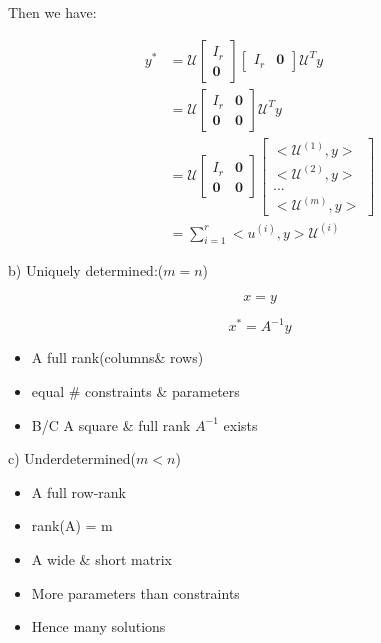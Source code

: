 Then we have:

\begin{align*}
y^{*} &= \mathcal{U}
\begin{bmatrix}
I_r\\
\textbf{0}
\end{bmatrix}
\begin{bmatrix}
I_r & \textbf{0}
\end{bmatrix}
\mathcal{U}^Ty\\
&= \mathcal{U}
\begin{bmatrix}
I_r& \textbf{0}\\
\textbf{0} & \textbf{0}
\end{bmatrix}
\mathcal{U}^Ty\\
&= \mathcal{U}
\begin{bmatrix}
I_r& \textbf{0}\\
\textbf{0} &  \textbf{0}
\end{bmatrix}
\begin{bmatrix}
<\mathcal{U}^{(1)}, y>\\
<\mathcal{U}^{(2)}, y>\\
...\\
<\mathcal{U}^{(m)}, y>
\end{bmatrix}\\
&= \sum^r_{i=1}<u^{(i)}, y>\mathcal{U}^{(i)}
\end{align*}

b) Uniquely determined:($m =n$)

\begin{equation*}
[A]x = y
\end{equation*}

\begin{equation*}
x^* = A^{-1}y
\end{equation*}

\begin{itemize}
	\item A full rank(columns\& rows)
	
	\item equal \# constraints \& parameters
	
	\item B/C A square \& full rank $A^{-1}$ exists
\end{itemize}

c) Underdetermined($m<n$)

\begin{itemize}
	\item A full row-rank
	
	\item rank(A) = m
	 
	\item A wide \& short matrix
	
	\item More parameters than constraints
	
	\item Hence many solutions
\end{itemize}

